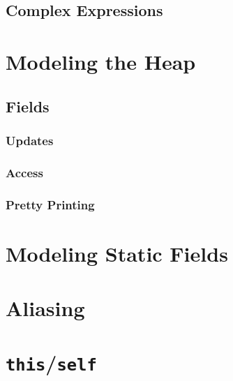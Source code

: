 \documentclass[a4paper, 11pt, accentcolor = tud3b]{tudreport}
\begin{document}
            \subsection{Complex Expressions} %

        \section{Modeling the Heap} %

            \subsection{Fields} %

                \subsubsection{Updates} %

                \subsubsection{Access} %

                \subsubsection{Pretty Printing} %

        \section{Modeling Static Fields} %

        \section{Aliasing} %

        \section{\texttt{this}/\texttt{self}} %
\end{document}
